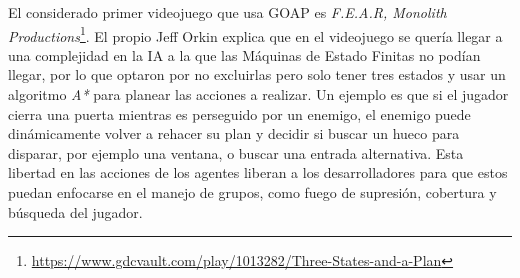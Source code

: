 El considerado primer videojuego que usa GOAP es \textit{F.E.A.R, Monolith Productions}\footnote{\url{https://www.gdcvault.com/play/1013282/Three-States-and-a-Plan}}. El propio Jeff Orkin explica que en el videojuego se quería llegar a una complejidad en la IA a la que las Máquinas de Estado Finitas no podían llegar, por lo que optaron por no excluirlas pero solo tener tres estados y usar un algoritmo \textit{A*} para planear las acciones a realizar. Un ejemplo es que si el jugador cierra una puerta mientras es perseguido por un enemigo, el enemigo puede dinámicamente volver a rehacer su plan y decidir si buscar un hueco para disparar, por ejemplo una ventana, o buscar una entrada alternativa. Esta libertad en las acciones de los agentes liberan a los desarrolladores para que estos puedan enfocarse en el manejo de grupos, como fuego de supresión, cobertura y búsqueda del jugador.\\

